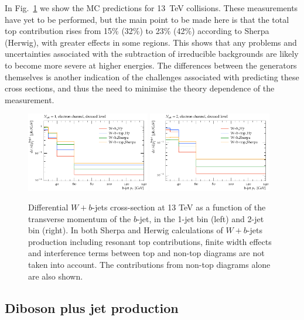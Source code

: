 \documentclass[11pt]{cernrep}
\begin{document}
In Fig.~\ref{fig:13tev} we show the MC predictions for 13~TeV collisions. These measurements have yet to be
performed, but the main point to be made here is that the total top contribution rises from 15\% (32\%)
to 23\% (42\%) according to Sherpa (Herwig), with greater effects in some regions. This shows that any
problems and uncertainties associated with the subtraction of irreducible backgrounds are likely to become
more severe at higher energies. The differences between the generators themselves is another indication of the 
challenges associated with predicting these cross sections, and thus the need to minimise the theory
dependence of the measurement.

\begin{figure}
\centering
	\includegraphics[width=0.48\textwidth]{13tev-1jet.pdf}
	\includegraphics[width=0.48\textwidth]{13tev-2jet.pdf}
\caption{\label{fig:13tev}
  Differential $W+b$-jets cross-section at 13 TeV as a function of the
  transverse momentum of the $b$-jet, in the 1-jet bin (left) and 2-jet bin (right).
  In both Sherpa and Herwig calculations of $W+b$-jets production including resonant top contributions, finite width effects 
  and interference terms between top and non-top diagrams are not
  taken into account. The contributions from non-top diagrams alone are also shown.}
\end{figure}

\subsection{Diboson plus jet production}
\end{document}
